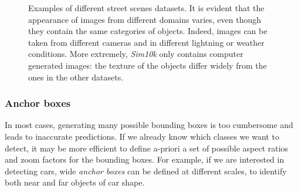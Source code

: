 \documentclass[%
    corpo=12pt,
    twoside,
    stile=classica,   
    tipotesi=magistrale,
    evenboxes,
    english,
	numerazioneromana,
]{toptesi}
\begin{document}
\begin{figure}[p]
	\centering
	\caption{Examples of different street scenes datasets. It is evident that the appearance of images from different domains varies, even though they contain the same categories of objects. Indeed, images can be taken from different cameras and in different lightning or weather conditions. More extremely, \textit{Sim10k} only contains computer generated images: the texture of the objects differ widely from the ones in the other datasets.}
	\label{fig:datasets}
\end{figure}

\subsubsection{Anchor boxes}\label{sec:anchor}
In most cases, generating many possible bounding boxes is too cumbersome and leads to inaccurate predictions. If we already know which classes we want to detect, it may be more efficient to define a-priori a set of possible aspect ratios and zoom factors for the bounding boxes. For example, if we are interested in detecting cars, wide \textit{anchor boxes} can be defined at different scales, to identify both near and far objects of car shape.
\end{document}
